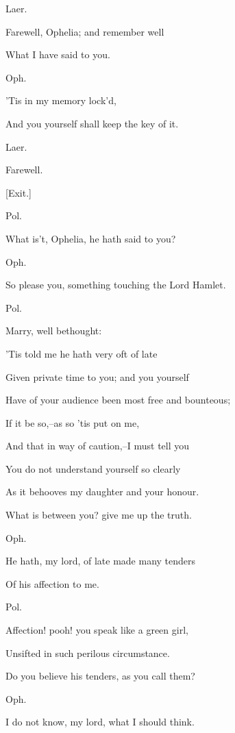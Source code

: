 \documentclass[12pt]{book}
\begin{document}
Laer.

Farewell, Ophelia; and remember well

What I have said to you.



Oph.

'Tis in my memory lock'd,

And you yourself shall keep the key of it.



Laer.

Farewell.



[Exit.]



Pol.

What is't, Ophelia, he hath said to you?



Oph.

So please you, something touching the Lord Hamlet.



Pol.

Marry, well bethought:

'Tis told me he hath very oft of late

Given private time to you; and you yourself

Have of your audience been most free and bounteous;

If it be so,--as so 'tis put on me,

And that in way of caution,--I must tell you

You do not understand yourself so clearly

As it behooves my daughter and your honour.

What is between you? give me up the truth.



Oph.

He hath, my lord, of late made many tenders

Of his affection to me.



Pol.

Affection! pooh! you speak like a green girl,

Unsifted in such perilous circumstance.

Do you believe his tenders, as you call them?



Oph.

I do not know, my lord, what I should think.
\end{document}
